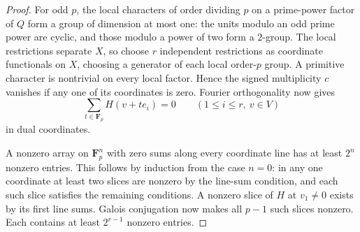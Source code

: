 \documentclass[11pt,letterpaper]{article}
\newcommand{\Fp}{\mathbf F_p}
\theoremstyle{remark}
\begin{document}
\begin{proof}
For odd $p$, the local characters of order dividing $p$ on a prime-power
factor of $Q$ form a group of dimension at most one: the units modulo
an odd prime power are cyclic, and those modulo a power of two form a
$2$-group. The local restrictions separate $X$, so choose $r$ independent
restrictions as coordinate functionals on $X$, choosing a generator of
each local order-$p$ group. A primitive character is nontrivial on every
local factor. Hence the signed multiplicity $c$ vanishes if any one of
its coordinates is zero. Fourier orthogonality now gives
\[
 \sum_{t\in\Fp} H(v+te_i)=0
 \qquad(1\le i\le r,\ v\in V)
\]
in dual coordinates.

A nonzero array on $\Fp^n$ with zero sums along every coordinate line
has at least $2^n$ nonzero entries. This follows by induction from the
case $n=0$: in any one coordinate at least two slices are nonzero by
the line-sum condition, and each such slice satisfies the remaining
conditions.  A nonzero slice of $H$ at $v_1\ne0$ exists by its first
line sums. Galois conjugation now makes all $p-1$ such slices nonzero.
Each contains at least $2^{r-1}$ nonzero entries.


\end{proof}
\end{document}
